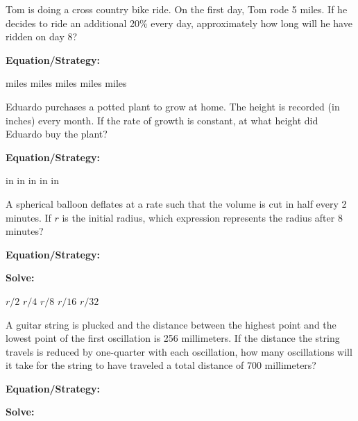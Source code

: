 \vfill
\newpage
\begin{multicols*}{2}
\medium

\begin{outline}[enumerate]
\1 Tom is doing a cross country bike ride. On the first day, Tom rode 5 miles. If he decides to ride an additional 20\% every day, approximately how long will he have ridden on day 8?

\bigskip
\textbf{Equation/Strategy:} \hrulefill

 miles
 miles
 miles
 miles
 miles

\midline

\bigskip
{}

\1 Eduardo purchases a potted plant to grow at home. The height is recorded (in inches) every month. If the rate of growth is constant, at what height did Eduardo buy the plant?

\bigskip
\textbf{Equation/Strategy:} \hrulefill

 in
 in
 in
 in
 in

\columnbreak
\advanced

\1 A spherical balloon deflates at a rate such that the volume is cut in half every 2 minutes. If $r$ is the initial radius, which expression represents the radius after 8 minutes?

\bigskip
\textbf{Equation/Strategy:} \hrulefill

\bigskip
\textbf{Solve:}

\vfill
\2 $r/2$
\2 $r/4$
\2 $r/8$
\2 $r/16$
\2 $r/32$

\midline

\1 A guitar string is plucked and the distance between the highest point and the lowest point of the first oscillation is 256 millimeters. If the distance the string travels is reduced by one-quarter with each oscillation, how many oscillations will it take for the string to have traveled a total distance of 700 millimeters?

\bigskip
\textbf{Equation/Strategy:} \hrulefill

\bigskip
\textbf{Solve:}

\vfill
{}
\end{outline}
\end{multicols*}